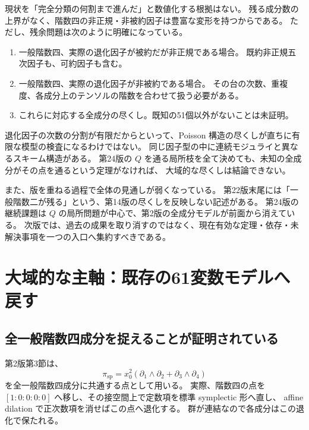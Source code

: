 \documentclass[11pt,a4paper]{ltjsarticle}
\theoremstyle{remark}\newtheorem{remark}[proposition]{注意}
\begin{document}
現状を「完全分類の何割まで進んだ」と数値化する根拠はない。
残る成分数の上界がなく、階数四の非正規・非被約因子は豊富な変形を持つからである。
ただし、残余問題は次のように明確になっている。
\begin{enumerate}
\item 一般階数四、実際の退化因子が被約だが非正規である場合。
既約非正規五次因子も、可約因子も含む。
\item 一般階数四、実際の退化因子が非被約である場合。
その台の次数、重複度、各成分上のテンソルの階数を合わせて扱う必要がある。
\item これらに対応する全成分の尽くし。既知の51個以外がないことは未証明。
\end{enumerate}

退化因子の次数の分割が有限だからといって、Poisson 構造の尽くしが直ちに有限な模型の検査になるわけではない。
同じ因子型の中に連続モジュライと異なるスキーム構造がある。
第24版の $Q$ を通る局所枝を全て決めても、未知の全成分がその点を通るという定理がなければ、
大域的な尽くしは結論できない。

また、版を重ねる過程で全体の見通しが弱くなっている。
第22版末尾には「一般階数二が残る」という、第14版の尽くしを反映しない記述がある。
第24版の継続課題は $Q$ の局所問題が中心で、第2版の全成分モデルが前面から消えている。
次版では、過去の成果を取り消すのではなく、現在有効な定理・依存・未解決事項を一つの入口へ集約すべきである。

\section{大域的な主軸：既存の61変数モデルへ戻す}

\subsection{全一般階数四成分を捉えることが証明されている}

第2版第3節は、
\[
 \pi_{\mathrm{sp}}=x_0^2
 (\partial_1\wedge\partial_2+\partial_3\wedge\partial_4)
\]
を全一般階数四成分に共通する点として用いる。
実際、階数四の点を $[1:0:0:0:0]$ へ移し、その接空間上で定数項を標準 symplectic 形へ直し、
affine dilation で正次数項を消せばこの点へ退化する。
群が連結なので各成分はこの退化で保たれる。
\end{document}
